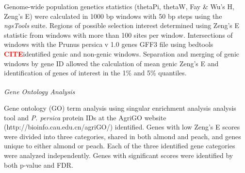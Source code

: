 \documentclass[12pt]{article}
\newcommand{\citex}{\textcolor{red}{\bf CITE}}
\begin{document}
Genome-wide population genetics statistics (thetaPi, thetaW, Fay \& Wu's H, Zeng's E) were calculated in 1000 bp windows with 50 bp steps using the \emph{ngsTools} \citep{fumagalli2014ngstools} suite.
%
Regions of possible selection interest determined using Zeng's E statistic \citep{zeng2006statistical} from windows with more than 100 sites per window.
%
Intersections of windows with the Prunus persica v 1.0 genes GFF3 file using bedtools \citex identified genic and non-genic windows.
%
Separation and merging of genic windows by gene ID allowed the calculation of mean genic Zeng's E and identification of genes of interest in the 1\% and 5\% quantiles.
\\
%
\\
\emph{Gene Ontology Analysis}

Gene ontology (GO) term analysis using singular enrichment analysis analysis tool and \emph{P. persica} protein IDs at the AgriGO website (http://bioinfo.cau.edu.cn/agriGO/) identified.
%
Genes with low Zeng's E scores were divided into three categories, shared in both almond and peach, and genes unique to either almond or peach. 
%
Each of the three identified gene categories were analyzed independently. 
%
Genes with significant scores were identified by both p-value and FDR.
\\
%
\\
\end{document}
